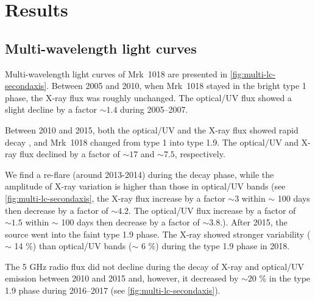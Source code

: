 \section{Results}
\label{sec:result}
\subsection{Multi-wavelength light curves}
\label{sec:multi-lc}%
Multi-wavelength light curves of Mrk~1018 are presented in \autoref{fig:multi-lc-secondaxis}. Between 2005 and 2010, when Mrk~1018 stayed in the bright type 1 phase, the X-ray flux was roughly unchanged. The optical/UV flux showed a slight decline by a factor $\sim 1.4 $ during 2005--2007. 

Between 2010 and 2015, both the optical/UV and the X-ray flux showed rapid decay \citep[see also ][]{2016A&A...593L...8M,2016A&A...593L...9H}, and Mrk~1018 changed from type 1 into type 1.9. The optical/UV and X-ray flux declined by a factor of $\sim 17$ and $\sim 7.5$, respectively. 

We find a re-flare (around 2013-2014) during the decay phase, while the amplitude of X-ray variation is higher than those in optical/UV bands (see \autoref{fig:multi-lc-secondaxis}, the X-ray flux increase by a factor $\sim 3$ within $\sim$ 100 days then decrease by a factor of $\sim 4.2$. The optical/UV flux increase by a factor of $\sim 1.5$ within $\sim$ 100 days then decrease by a factor of $\sim 3.8$.). After 2015, the source went into the faint type 1.9 phase. The X-ray showed stronger variability ($\sim $ 14 \%) than optical/UV bands ($\sim $ 6 \%) during the type 1.9 phase in 2018.  

The 5 GHz radio flux did not decline during the decay of X-ray and optical/UV emission between 2010 and 2015 and, however, it decreased by $\sim 20$ \% in the type 1.9 phase during 2016--2017 (see \autoref{fig:multi-lc-secondaxis}).



